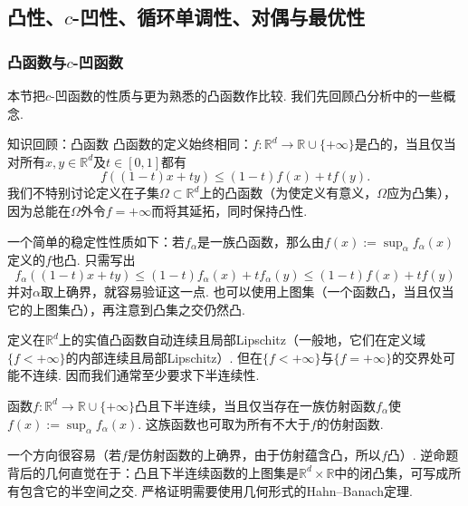 \subsection[凸性、c-凹性、循环单调性、对偶与最优性]{凸性、$c$-凹性、循环单调性、对偶与最优性}\label{sec:1.6}

\subsubsection[凸函数与c-凹函数]{凸函数与$c$-凹函数}\label{sec:1.6.1}

本节把$c$-凹函数的性质与更为熟悉的凸函数作比较. 我们先回顾凸分析中的一些概念.

\begin{sourcebox}{知识回顾：凸函数}\label{box:1.11}
凸函数的定义始终相同：$f:\mathbb R^d\to\mathbb R\cup\{+\infty\}$是凸的，当且仅当对所有$x,y\in\mathbb R^d$及$t\in[0,1]$都有
\[
f((1-t)x+ty)\le(1-t)f(x)+tf(y).
\]
我们不特别讨论定义在子集$\Omega\subset\mathbb R^d$上的凸函数（为使定义有意义，$\Omega$应为凸集），因为总能在$\Omega$外令$f=+\infty$而将其延拓，同时保持凸性.

一个简单的稳定性性质如下：若$f_\alpha$是一族凸函数，那么由$f(x):=\sup_\alpha f_\alpha(x)$定义的$f$也凸. 只需写出
\[
f_\alpha((1-t)x+ty)\le(1-t)f_\alpha(x)+tf_\alpha(y)
\le(1-t)f(x)+tf(y)
\]
并对$\alpha$取上确界，就容易验证这一点. 也可以使用上图集（一个函数凸，当且仅当它的上图集凸），再注意到凸集之交仍然凸.

定义在$\mathbb R^d$上的实值凸函数自动连续且局部Lipschitz（一般地，它们在定义域$\{f<+\infty\}$的内部连续且局部Lipschitz）. 但在$\{f<+\infty\}$与$\{f=+\infty\}$的交界处可能不连续. 因而我们通常至少要求下半连续性.

\begin{theorem*}
函数$f:\mathbb R^d\to\mathbb R\cup\{+\infty\}$凸且下半连续，当且仅当存在一族仿射函数$f_\alpha$使$f(x):=\sup_\alpha f_\alpha(x)$. 这族函数也可取为所有不大于$f$的仿射函数.
\end{theorem*}

一个方向很容易（若$f$是仿射函数的上确界，由于仿射蕴含凸，所以$f$凸）. 逆命题背后的几何直觉在于：凸且下半连续函数的上图集是$\mathbb R^d\times\mathbb R$中的闭凸集，可写成所有包含它的半空间之交. 严格证明需要使用几何形式的Hahn--Banach定理.
\end{sourcebox}

